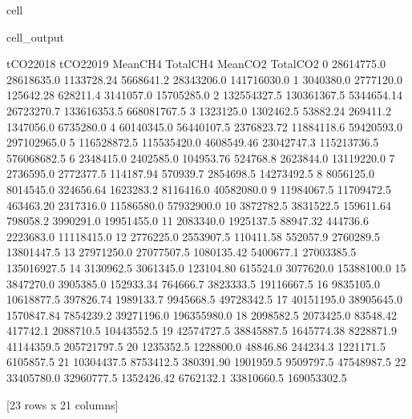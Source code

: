 \documentclass[letterpaper,10pt,english]{jupyterBook}
\begin{document}
\begin{sphinxuseclass}{cell}
\begin{sphinxVerbatimOutput}
\begin{sphinxuseclass}{cell_output}
\begin{sphinxVerbatim}[commandchars=\\\{\}]
      tCO2\PYGZus{}2018    tCO2\PYGZus{}2019    Mean\PYGZus{}CH4   Total\PYGZus{}CH4     Mean\PYGZus{}CO2    Total\PYGZus{}CO2  
0    28614775.0   28618635.0  1133728.24   5668641.2   28343206.0  141716030.0  
1     3040380.0    2777120.0   125642.28    628211.4    3141057.0   15705285.0  
2   132554327.5  130361367.5  5344654.14  26723270.7  133616353.5  668081767.5  
3     1323125.0    1302462.5    53882.24    269411.2    1347056.0    6735280.0  
4    60140345.0   56440107.5  2376823.72  11884118.6   59420593.0  297102965.0  
5   116528872.5  115535420.0  4608549.46  23042747.3  115213736.5  576068682.5  
6     2348415.0    2402585.0   104953.76    524768.8    2623844.0   13119220.0  
7     2736595.0    2772377.5   114187.94    570939.7    2854698.5   14273492.5  
8     8056125.0    8014545.0   324656.64   1623283.2    8116416.0   40582080.0  
9    11984067.5   11709472.5   463463.20   2317316.0   11586580.0   57932900.0  
10    3872782.5    3831522.5   159611.64    798058.2    3990291.0   19951455.0  
11    2083340.0    1925137.5    88947.32    444736.6    2223683.0   11118415.0  
12    2776225.0    2553907.5   110411.58    552057.9    2760289.5   13801447.5  
13   27971250.0   27077507.5  1080135.42   5400677.1   27003385.5  135016927.5  
14    3130962.5    3061345.0   123104.80    615524.0    3077620.0   15388100.0  
15    3847270.0    3905385.0   152933.34    764666.7    3823333.5   19116667.5  
16    9835105.0   10618877.5   397826.74   1989133.7    9945668.5   49728342.5  
17   40151195.0   38905645.0  1570847.84   7854239.2   39271196.0  196355980.0  
18    2098582.5    2073425.0    83548.42    417742.1    2088710.5   10443552.5  
19   42574727.5   38845887.5  1645774.38   8228871.9   41144359.5  205721797.5  
20    1235352.5    1228800.0    48846.86    244234.3    1221171.5    6105857.5  
21   10304437.5    8753412.5   380391.90   1901959.5    9509797.5   47548987.5  
22   33405780.0   32960777.5  1352426.42   6762132.1   33810660.5  169053302.5  

[23 rows x 21 columns]
\end{sphinxVerbatim}

\end{sphinxuseclass}\end{sphinxVerbatimOutput}

\end{sphinxuseclass}
\end{document}

